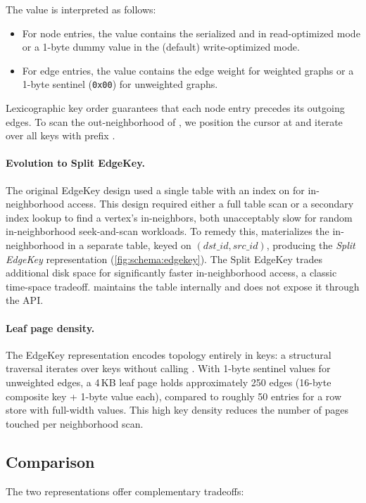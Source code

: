 The value is interpreted as follows:
\begin{itemize}
  \item For node entries, the value contains the serialized  and  in read-optimized mode or a 1-byte dummy value in the (default) write-optimized mode.
  \item For edge entries, the value contains the edge weight for weighted graphs or a 1-byte sentinel (\texttt{0x00}) for unweighted graphs.
\end{itemize}
Lexicographic key order guarantees that each node entry precedes its outgoing edges.
To scan the out-neighborhood of , we position the cursor at  and iterate over all keys with prefix .

\paragraph{Evolution to Split EdgeKey.}
The original EdgeKey design used a single table with an index on  for in-neighborhood access.
This design required either a full table scan or a secondary index lookup to find a vertex's in-neighbors, both unacceptably slow for random in-neighborhood seek-and-scan workloads.
To remedy this, \project{} materializes the in-neighborhood in a separate  table, keyed on $(dst\_id, src\_id)$, producing the \emph{Split EdgeKey} representation (\autoref{fig:schema:edgekey}).
The Split EdgeKey trades additional disk space for significantly faster in-neighborhood access, a classic time-space tradeoff.
\project{} maintains the  table internally and does not expose it through the API.

\paragraph{Leaf page density.}
The EdgeKey representation encodes topology entirely in keys: a structural traversal iterates over keys without calling .
With 1-byte sentinel values for unweighted edges, a 4\,KB leaf page holds approximately 250 edges (16-byte composite key + 1-byte value each), compared to roughly 50 entries for a row store with full-width values.
This high key density reduces the number of pages touched per neighborhood scan.



\subsection{Comparison}
\label{arch:comparison}
The two representations offer complementary tradeoffs:

